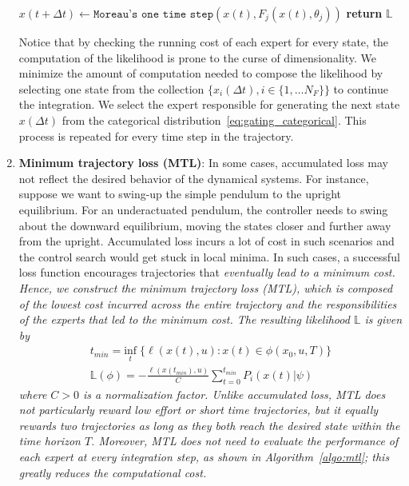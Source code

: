 \begin{enumerate}
\begin{algorithm}[H]
\begin{algorithmic}[1]
                \State $x(t + \Delta t) \leftarrow \texttt{Moreau's one time step}(x(t), F_j(x(t), \theta_j))$
                \EndFor
            \State \textbf{return} $\mathbb{L}$
        \end{algorithmic}
    \end{algorithm}
    Notice that by checking the running cost of each expert for every state, the
    computation of the likelihood is prone to the curse of dimensionality.
    We minimize the amount of computation needed to compose the likelihood by
    selecting one state from the collection $\{ x_i(\Delta t) , i \in \{1,
    \dots N_F \}\}$ to continue the integration.
    We select the expert responsible for generating the next state $x(\Delta t)$ from the
    categorical distribution~\eqref{eq:gating_categorical}.
    This process is repeated for every time step in the trajectory.

  
    \item \textbf{Minimum trajectory loss (MTL)}: In some cases,
    accumulated loss may not reflect the desired behavior of the dynamical
    systems.
    For instance, suppose we want to swing-up the simple pendulum to the upright
    equilibrium. 
    For an underactuated pendulum, the controller needs to swing about the
    downward equilibrium, moving the states closer and further away from the
    upright.
    Accumulated loss incurs a lot of cost in such scenarios and the control
    search would get stuck in local minima.
    In such cases, a successful loss function encourages trajectories that
    \it{eventually} \normalfont lead to a minimum cost.
    Hence, we construct the minimum trajectory loss (MTL), which is composed of
    the lowest cost incurred across the entire trajectory and the
    responsibilities of the experts that led to the minimum cost.
    The resulting likelihood $\mathbb{L}$ is given by
    \begin{equation}
        \begin{gathered}
            t_{min} = \underset{t}{\textrm{inf}} \; \{ \ell(x(t), u): x(t) \in \phi(x_0, u, T) \}  \\
            \mathbb{L}(\phi) = - \frac{\ell(x(t_{min}), u)}{C} \sum_{t=0}^{t_{min}}P_i(x(t) | \psi) 
        \end{gathered} 
    \end{equation}
    \noindent where $C > 0$ is a normalization factor.
    Unlike accumulated loss, MTL does not particularly reward low effort or
    short time trajectories, but it equally rewards two trajectories
    as long as they both reach the desired state within the time horizon $T$. 
    Moreover, MTL does not need to evaluate the performance of each expert at
    every integration step, as shown in Algorithm~\eqref{algo:mtl}; this greatly
    reduces the computational cost.
    

\end{enumerate}
